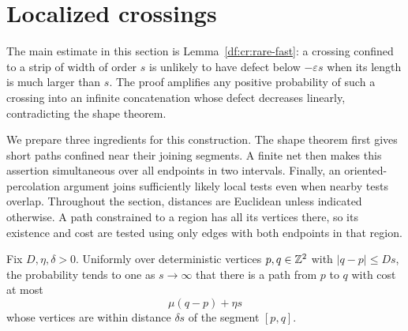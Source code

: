 \section{Localized crossings}\label{df:sec:crossings}

The main estimate in this section is Lemma~\ref{df:cr:rare-fast}: a crossing
confined to a strip of width of order $s$ is unlikely to have defect below
$-\varepsilon s$ when its length is much larger than $s$. The proof amplifies
any positive probability of such a crossing into an infinite concatenation
whose defect decreases linearly, contradicting the shape theorem.

We prepare three ingredients for this construction. The shape theorem first
gives short paths confined near their joining segments. A finite net then
makes this assertion simultaneous over all endpoints in two intervals.
Finally, an oriented-percolation argument joins sufficiently likely local
tests even when nearby tests overlap. Throughout the section, distances are
Euclidean unless indicated otherwise. A path constrained to a region has
all its vertices there, so its existence and cost are tested using only
edges with both endpoints in that region.

\begin{lemma}\label{df:cr:local-travel}
Fix $D,\eta,\delta>0$. Uniformly over deterministic vertices $p,q\in\mathbb Z^2$
with $|q-p|\le Ds$, the probability tends to one as $s\to\infty$
that there is a path from $p$ to $q$ with cost at most
\[
  \mu(q-p)+\eta s
\]
whose vertices are within distance $\delta s$ of the segment $[p,q]$.
\end{lemma}

